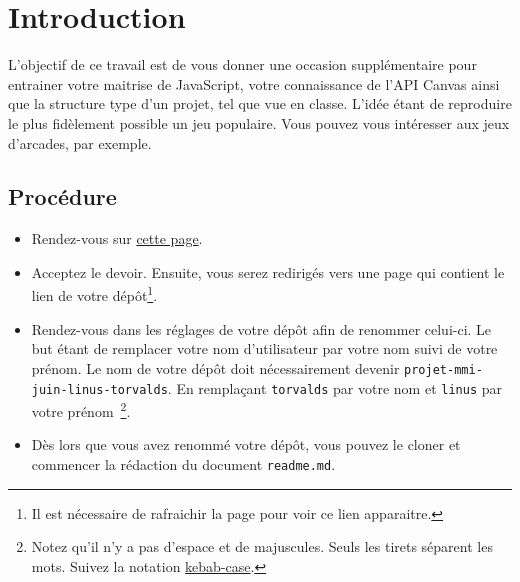 \pagestyle{mypagestyle}

\maketitle

\section{Introduction}

L’objectif de ce travail est de vous donner une occasion supplémentaire pour entrainer votre maitrise de JavaScript, votre connaissance de l'API Canvas ainsi que la structure type d'un projet, tel que vue en classe. L'idée étant de reproduire le plus fidèlement possible un jeu populaire. Vous pouvez vous intéresser aux jeux d'arcades, par exemple.

\subsection{Procédure}
\label{procedure}

\begin{itemize}
  \item Rendez-vous sur \href{https://classroom.github.com/a/xBzM63w9}{cette page}.
  \item Acceptez le devoir. Ensuite, vous serez redirigés vers une page qui contient le lien de votre dépôt\footnote{Il est nécessaire de rafraichir la page pour voir ce lien apparaitre.}.
  \item Rendez-vous dans les réglages de votre dépôt afin de renommer celui-ci. Le but étant de remplacer votre nom d'utilisateur par votre nom suivi de votre prénom. Le nom de votre dépôt doit nécessairement devenir \verb!projet-mmi-juin-linus-torvalds!. En remplaçant \verb!torvalds! par votre nom et \verb!linus! par votre prénom~\footnote{Notez qu’il n'y a pas d'espace et de majuscules. Seuls les tirets séparent les mots. Suivez la notation \href{https://en.wiktionary.org/wiki/kebab_case}{kebab-case}.}.
  \item Dès lors que vous avez renommé votre dépôt, vous pouvez le cloner et commencer la rédaction du document \verb!readme.md!.
\end{itemize}
\vspace*{2cm}
\begin{figure}[htbp]
  \centering
  
\end{figure}

